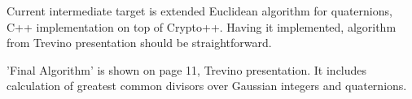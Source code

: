 \documentclass[a4paper,12pt]{article}
\begin{document}
Current intermediate target is extended Euclidean algorithm for quaternions, C++ implementation on top of Crypto++.
Having it implemented, algorithm from Trevino presentation should be straightforward.

'Final Algorithm' is shown on page 11, Trevino presentation.
It includes calculation of greatest common divisors over Gaussian integers and quaternions.

  
\end{document}
